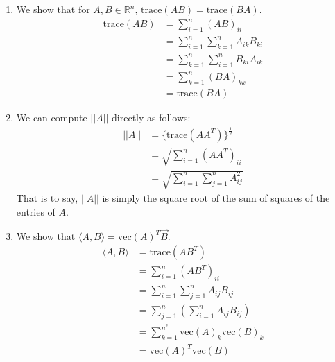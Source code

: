 \documentclass[12pt]{exam}
\newcommand{\Q}[1]{\question{\large{\textbf{#1}}}}
\begin{document}
\begin{questions}
\newpage
\Q{Trace of a square matrix}
\begin{solution}
\begin{enumerate}[label=(\alph*)]
  \item We show that for $A,B \in \mathbb{R}^n$, $\text{trace}(AB) = \text{trace}(BA)$.
  \begin{align*}
    \text{trace}(AB) &= \sum_{i = 1}^n (AB)_{ii} \tag{Definition of trace} \\
    &= \sum_{i=1}^n \sum_{k=1}^n A_{ik}B_{ki} \tag{Definition of matrix multiplication} \\
    &= \sum_{k=1}^n \sum_{i=1}^n B_{ki}A_{ik} \tag{Swap summation indexes and use commutativity of scalar multiplication} \\
    &= \sum_{k=1}^n (BA)_{kk} \tag{Definition of matrix multiplication} \\
    &= \text{trace}(BA) \tag{Definition of trace}
  \end{align*}
  \item We can compute $||A||$ directly as follows:
  \begin{align*}
    ||A|| &= \{\text{trace}(AA^T)\}^{\frac{1}{2}} \\
    &= \sqrt{\sum_{i=1}^n (AA^T)_{ii}} \tag{Definition of trace} \\
    &= \sqrt{\sum_{i=1}^n \sum_{j=1}^n A_{ij}^2 } \tag{Definition of matrix multiplication}
  \end{align*}
  That is to say, $||A||$ is simply the square root of the sum of squares of the entries of $A$.
  \item We show that $\langle A, B \rangle = \text{vec}(A)^T \vec{B}$. 
  \begin{align*}
    \langle A, B \rangle &= \text{trace}(AB^T) \tag{Given in part (b)} \\
    &= \sum_{i=1}^n (AB^T)_{ii} \tag{Definition of trace} \\
    &= \sum_{i=1}^n \sum_{j=1}^n A_{ij}B_{ij} \tag{Definition of matrix multiplication} \\
    &= \sum_{j=1}^n \left( \sum_{i=1}^n A_{ij}B_{ij} \right) \tag{Swap indeces to show that we're multiplying elements in corresponding columns and summing them} \\
    &= \sum_{k=1}^{n^2} \text{vec}(A)_k \text{vec}(B)_k \tag{Re-indexing and using definition of vec($\cdot$)} \\
    &= \text{vec}(A)^T \text{vec}(B) \tag{Definition of dot product}
  \end{align*}


\end{enumerate}
\end{solution}
\end{questions}
\end{document}
